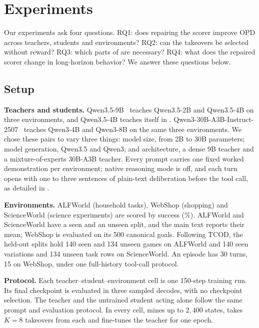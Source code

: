 \section{Experiments}
\label{sec:exp}

Our experiments ask four questions. RQ1: does repairing the scorer improve OPD across teachers, students and environments? RQ2: can the takeovers be selected without reward? RQ3: which parts of \method{} are necessary? RQ4: what does the repaired scorer change in long-horizon behavior? We answer these questions below.



\subsection{Setup}
\label{sec:exp-setup}

\textbf{Teachers and students.}
Qwen3.5-9B~\citep{qwen352026} teaches Qwen3.5-2B and Qwen3.5-4B on three environments, and Qwen3.5-4B teaches itself in .
Qwen3-30B-A3B-Instruct-2507~\citep{qwen32025} teaches Qwen3-4B and Qwen3-8B on the same three environments.
We chose these pairs to vary three things: model size, from 2B to 30B parameters; model generation, Qwen3.5 and Qwen3; and architecture, a dense 9B teacher and a mixture-of-experts 30B-A3B teacher.
Every prompt carries one fixed worked demonstration per environment; native reasoning mode is off, and each turn opens with one to three sentences of plain-text deliberation before the tool call, as detailed in .

\textbf{Environments.}
ALFWorld (household tasks), WebShop (shopping) and ScienceWorld (science experiments) are scored by success (\%). ALFWorld and ScienceWorld have a seen and an unseen split, and the main text reports their mean; WebShop is evaluated on its 500 canonical goals. Following TCOD, the held-out splits hold 140 seen and 134 unseen games on ALFWorld and 140 seen variations and 134 unseen task rows on ScienceWorld. An episode has 30 turns, 15 on WebShop, under one full-history tool-call protocol.

\textbf{Protocol.}
Each teacher--student--environment cell is one 150-step training run. Its final checkpoint is evaluated in three sampled decodes, with no checkpoint selection. The teacher and the untrained student acting alone follow the same prompt and evaluation protocol. In every cell, \method{} mines up to $2{,}400$ states, takes $K{=}8$ takeovers from each and fine-tunes the teacher for one epoch.

